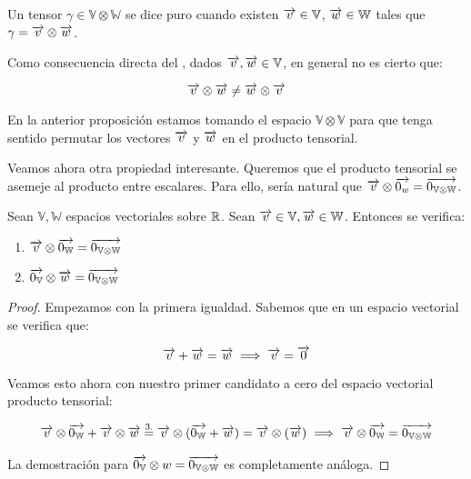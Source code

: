 \begin{definicion} \label{def:tensor_puro}
	Un tensor $\gamma \in \mathbb{V} \otimes \mathbb{W}$ se dice puro cuando existen $\overrightarrow{v} \in \mathbb{V}$, $\overrightarrow{w} \in \mathbb{W}$ tales que $\gamma = \overrightarrow{v} \otimes \overrightarrow{w}$.
\end{definicion}

\begin{proposicion}
	Como consecuencia directa del , dados $\overrightarrow{v}, \overrightarrow{w} \in \mathbb{V}$, en general no es cierto que:

	\begin{equation}
		\overrightarrow{v} \otimes \overrightarrow{w} \neq \overrightarrow{w} \otimes \overrightarrow{v}
	\end{equation}

	\begin{observacion}
		En la anterior proposición estamos tomando el espacio $\mathbb{V} \otimes \mathbb{V}$ para que tenga sentido permutar los vectores $\overrightarrow{v}$ y $\overrightarrow{w}$ en el producto tensorial.
	\end{observacion}
\end{proposicion}

Veamos ahora otra propiedad interesante. Queremos que el producto tensorial se asemeje al producto entre escalares. Para ello, sería natural que $\overrightarrow{v} \otimes \overrightarrow{0_w} = \overrightarrow{0_{\mathbb{V} \otimes \mathbb{W}}}$.

\begin{proposicion}
	Sean $\mathbb{V}, \mathbb{W}$ espacios vectoriales sobre $\mathbb{R}$. Sean $\overrightarrow{v} \in \mathbb{V}, \overrightarrow{w} \in \mathbb{W}$. Entonces se verifica:

	\begin{enumerate}
		\item $\overrightarrow{v} \otimes \overrightarrow{0_\mathbb{W}} = \overrightarrow{0_{\mathbb{V} \otimes \mathbb{W}}}$
		\item $\overrightarrow{0_{\mathbb{V}}} \otimes \overrightarrow{w} = \overrightarrow{0_{\mathbb{V} \otimes \mathbb{W}}}$
	\end{enumerate}
\end{proposicion}
\begin{proof}
	Empezamos con la primera igualdad. Sabemos que en un espacio vectorial se verifica que:

	\begin{equation} \label{eq:dem_tensor_cero}
		\overrightarrow{v} + \overrightarrow{w} = \overrightarrow{w} \implies \overrightarrow{v} = \overrightarrow{0}
	\end{equation}

	Veamos esto ahora con nuestro primer candidato a cero del espacio vectorial producto tensorial:

	\begin{equation}
		\begin{split}
			\overrightarrow{v} \otimes \overrightarrow{0_\mathbb{W}} + \overrightarrow{v} \otimes \overrightarrow{w} \stackrel{\text{3.}}{=} \overrightarrow{v} \otimes (\overrightarrow{0_\mathbb{W}} + \overrightarrow{w}) = \overrightarrow{v} \otimes (\overrightarrow{w}) \implies \overrightarrow{v} \otimes \overrightarrow{0_\mathbb{W}} = \overrightarrow{0_{\mathbb{V} \otimes \mathbb{W}}}
		\end{split}
	\end{equation}

	La demostración para $\overrightarrow{0_{\mathbb{V}}} \otimes w = \overrightarrow{0_{\mathbb{V} \otimes \mathbb{W}}}$ es completamente análoga.
\end{proof}

